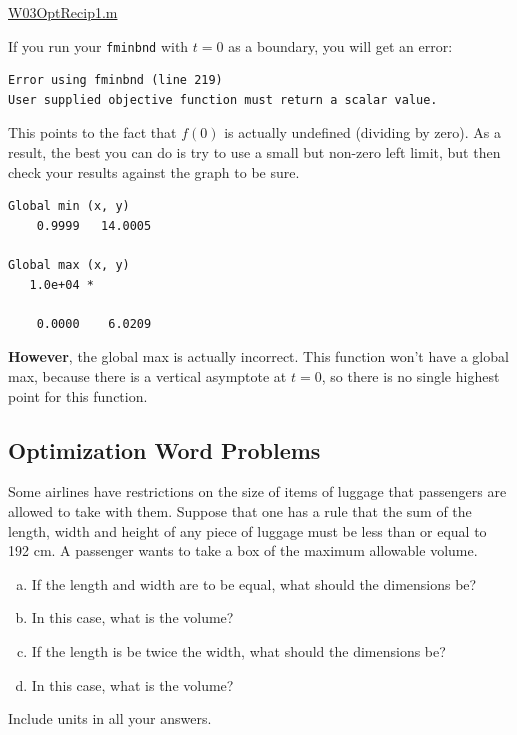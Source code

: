\begin{enumerate}[1.]
\begin{multicols}{2}
\begin{Solution}
\href{http://www.mast.queensu.ca/~apsc171/MNTCP01/PracticeProblems/MATLAB/W03OptRecip1.m}{W03OptRecip1.m}

  If you run your \texttt{fminbnd} with $t=0$ as a boundary, you will get an error:
\begin{verbatim}
Error using fminbnd (line 219)
User supplied objective function must return a scalar value.
\end{verbatim}
  This points to the fact that $f(0)$ is actually undefined (dividing
  by zero).  As a result, the best you can do is try to use a small
  but non-zero left limit, but then check your results against the
  graph to be sure.

\begin{verbatim}
Global min (x, y) 
    0.9999   14.0005

Global max (x, y) 
   1.0e+04 *

    0.0000    6.0209
\end{verbatim}
  {\bf However}, the global max is actually incorrect.  This function won't have a global max, 
  because there is a vertical asymptote at $t=0$, so there is no single highest point for this function.

\end{Solution}

\end{multicols}
\hrulefill
\subsection*{Optimization Word Problems}

\begin{multicols}{2}

\item
\begin{Question}
 Some airlines have restrictions on the size of items of luggage that
passengers are allowed to take with them.  Suppose that one has a rule
that the sum of the length, width and height of any piece of luggage
must be less than or equal to 192 cm.  A passenger wants to take a
box of the maximum allowable volume.    
\begin{enumerate}[(a)]
\item If the length and width are to
be equal, what should the dimensions be?
\item In this case, what is the volume? 
\item If the length is be twice the width, what should the dimensions be? 
\item In this case, what is the volume? 
\end{enumerate}
Include units in all your answers.
\par  \end{Question}
\begin{Solution}
 

\end{Solution}
\end{multicols}
\end{enumerate}
